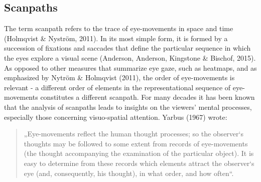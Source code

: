 \documentclass[a4paper, 11pt]{scrreprt}
\begin{document}
\subsection{Scanpaths}
The term scanpath refers to the trace of eye-movements in space and time (Holmqvist \& Nyström, 2011). In its most simple form, it is formed by a succession of fixations and saccades that define the particular sequence in which the eyes explore a visual scene (Anderson, Anderson, Kingstone \& Bischof, 2015). As opposed to other measures that summarize eye gaze, such as heatmaps, and as  emphasized by Nytröm \& Holmqvist (2011), the order of eye-movements is relevant - a different order of elements in the representational sequence of eye-movements constitutes a different scanpath. \newline
For many decades it has been known that the analysis of scanpaths leads to insights on the viewers’ mental processes, especially those concerning visuo-spatial attention. Yarbus (1967) wrote: 
\begin{quotation}
\footnotesize{„Eye-movements reflect the human thought processes; so the observer‘s thoughts may be followed to some extent from records of eye-movements (the thought accompanying the examination of the particular object). It is easy to determine from these records which elements attract the observer‘s eye (and, consequently, his thought), in what order, and how often“.}
\end{quotation}
\end{document}
